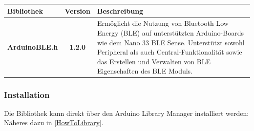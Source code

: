 	\begin{table}[H]
		\centering
		\begin{tabular}{|l|c|p{8cm}|}
			\hline
			\textbf{Bibliothek} & \textbf{Version} & \textbf{Beschreibung} \\
			\hline
			\textbf{ArduinoBLE.h} & \textbf{1.2.0} & Ermöglicht die Nutzung von Bluetooth Low Energy (BLE) auf unterstützten Arduino-Boards wie dem Nano 33 BLE Sense. Unterstützt sowohl Peripheral als auch Central-Funktionalität sowie das Erstellen und Verwalten von BLE Eigenschaften des BLE Moduls. \\
			\hline
		\end{tabular}
	\end{table}

	\subsubsection{Installation}
	Die Bibliothek kann direkt über den Arduino Library Manager installiert werden:
	Näheres dazu in  \autoref{HowToLibrary}.
	
